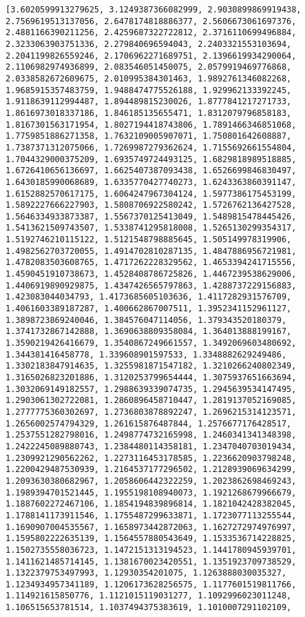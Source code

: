 \documentclass[11pt]{article}
\begin{document}
    \begin{Verbatim}[commandchars=\\\{\}]
[3.6020599913279625, 3.1249387366082999, 2.9030899869919438, 2.7569619513137056, 2.6478174818886377, 2.5606673061697376, 2.4881166390211256, 2.4259687322722812, 2.3716110699496884, 2.3233063903751336, 2.279840696594043, 2.2403321553103694, 2.2041199826559246, 2.1706962271689751, 2.1396619934290064, 2.1106982974936899, 2.083546051450075, 2.0579919469776868, 2.0338582672609675, 2.010995384301463, 1.9892761346082268, 1.9685915357483759, 1.9488474775526188, 1.929962133392245, 1.9118639112994487, 1.894489815230026, 1.8777841217271733, 1.8616973018337186, 1.846185135655471, 1.8312079796858183, 1.8167301563171954, 1.8027194418743806, 1.7891466346851068, 1.7759851886271358, 1.7632109005907071, 1.750801642608887, 1.7387371312075066, 1.7269987279362624, 1.7155692661554804, 1.7044329000375209, 1.6935749724493125, 1.6829818989518885, 1.6726410656136697, 1.6625407387093438, 1.6526699846830497, 1.6430185990068689, 1.6335770427740273, 1.6243363860391147, 1.6152882570617175, 1.6064247967304124, 1.5977386175453199, 1.5892227666227903, 1.5808706922580242, 1.5726762136427528, 1.5646334933873387, 1.5567370125413049, 1.5489815478445426, 1.5413621509743507, 1.5338741295818008, 1.5265130299354317, 1.5192746210115122, 1.5121548798885645, 1.505149978319906, 1.4982562703720055, 1.4914702810287135, 1.4847886956721981, 1.4782083503608765, 1.4717262228329562, 1.4653394241715556, 1.4590451910738673, 1.4528408786725826, 1.4467239538629006, 1.4406919890929875, 1.4347426565797863, 1.4288737229156883, 1.423083044034793, 1.4173685605103636, 1.4117282931576709, 1.4061603389187287, 1.400662867007511, 1.3952341152961127, 1.3898723869240046, 1.384576047114056, 1.379343520180379, 1.3741732867142888, 1.3690638809358084, 1.364013888199167, 1.3590219426416679, 1.3540867249661557, 1.3492069603480692, 1.344381416458778, 1.339608901597533, 1.3348882629249486, 1.3302183847914635, 1.3255981871547182, 1.3210266240802349, 1.3165026823201886, 1.3120253799654444, 1.3075937651663694, 1.3032069149182557, 1.2988639339074735, 1.2945639534147495, 1.2903061302722081, 1.2860896458710447, 1.2819137052169085, 1.2777775360302697, 1.2736803878892247, 1.2696215314123571, 1.2656002574794329, 1.261615876487844, 1.2576677176428517, 1.2537551282798016, 1.2498774732165998, 1.2460341341348398, 1.2422245089880743, 1.2384480114358181, 1.2347040703019434, 1.2309921290562262, 1.2273116453178585, 1.2236620903798248, 1.2200429487530939, 1.2164537177296502, 1.2128939069634299, 1.2093630380682967, 1.2058606442322259, 1.2023862698469243, 1.1989394701521445, 1.1955198108940073, 1.1921268679966679, 1.1887602272467106, 1.1854194839896814, 1.1821042428382045, 1.1788141173911546, 1.1755487299633871, 1.1723077113255544, 1.1690907004535567, 1.1658973442872063, 1.1627272974976997, 1.1595802222635139, 1.1564557880543649, 1.1533536714228825, 1.1502735558036723, 1.1472151313194523, 1.1441780945939701, 1.1411621485714145, 1.1381670023420551, 1.1351923709738529, 1.1322379753497993, 1.12930354201075, 1.1263888030035327, 1.1234934957341189, 1.1206173628256575, 1.1177601519811766, 1.114921615850776, 1.1121015119031277, 1.1092996023011248, 1.106515653781514, 1.1037494375383619, 1.1010007291102109, 
\end{Verbatim}
\end{document}
